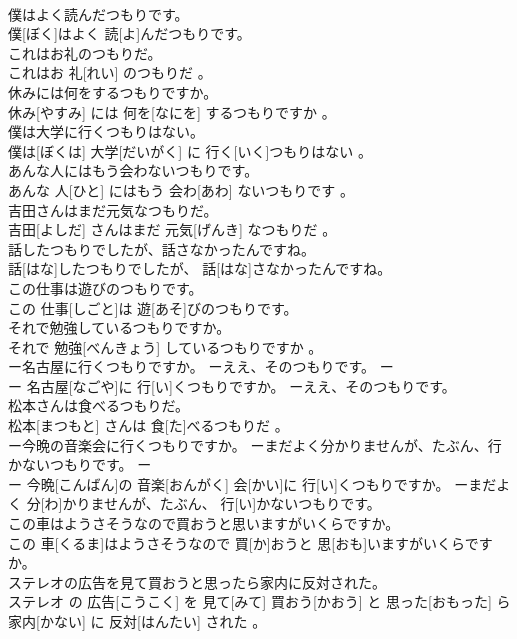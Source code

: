 \documentclass[8pt]{extreport}
\begin{document}
\begin{CJK}{UTF8}{min}
\\	僕はよく読んだつもりです。	
\\	僕[ぼく]はよく 読[よ]んだつもりです。
\\	これはお礼のつもりだ。	
\\	これはお 礼[れい] のつもりだ 。
\\	休みには何をするつもりですか。	
\\	休み[やすみ] には 何を[なにを] するつもりですか 。
\\	僕は大学に行くつもりはない。	
\\	僕は[ぼくは] 大学[だいがく] に 行く[いく]つもりはない 。
\\	あんな人にはもう会わないつもりです。	
\\	あんな 人[ひと] にはもう 会わ[あわ] ないつもりです 。
\\	吉田さんはまだ元気なつもりだ。	
\\	吉田[よしだ] さんはまだ 元気[げんき] なつもりだ 。
\\	話したつもりでしたが、話さなかったんですね。	
\\	話[はな]したつもりでしたが、 話[はな]さなかったんですね。
\\	この仕事は遊びのつもりです。	
\\	この 仕事[しごと]は 遊[あそ]びのつもりです。
\\	それで勉強しているつもりですか。	
\\	それで 勉強[べんきょう] しているつもりですか 。
\\	ー名古屋に行くつもりですか。 ーええ、そのつもりです。	ー
\\	ー 名古屋[なごや]に 行[い]くつもりですか。 ーええ、そのつもりです。
\\	松本さんは食べるつもりだ。	
\\	松本[まつもと] さんは 食[た]べるつもりだ 。
\\	ー今晩の音楽会に行くつもりですか。 ーまだよく分かりませんが、たぶん、行かないつもりです。	ー
\\	ー 今晩[こんばん]の 音楽[おんがく] 会[かい]に 行[い]くつもりですか。 ーまだよく 分[わ]かりませんが、たぶん、 行[い]かないつもりです。
\\	この車はようさそうなので買おうと思いますがいくらですか。	
\\	この 車[くるま]はようさそうなので 買[か]おうと 思[おも]いますがいくらですか。
\\	ステレオの広告を見て買おうと思ったら家内に反対された。	
\\	ステレオ の 広告[こうこく] を 見て[みて] 買おう[かおう] と 思った[おもった] ら 家内[かない] に 反対[はんたい] された 。

\end{CJK}
\end{document}

